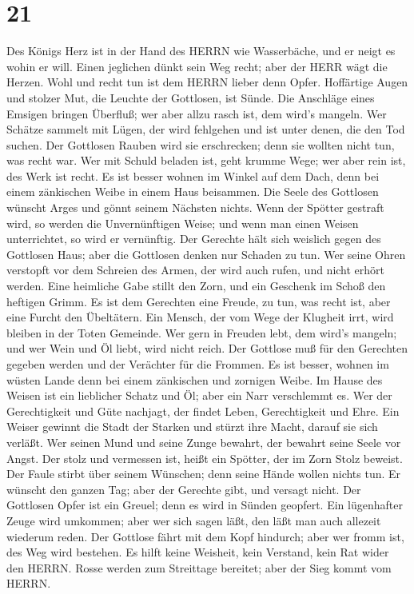 \hypertarget{section-20}{%
\section{21}\label{section-20}}

 Des Königs Herz ist in der Hand des HERRN wie Wasserbäche,
und er neigt es wohin er will.  Einen jeglichen dünkt sein
Weg recht; aber der HERR wägt die Herzen.  Wohl und recht
tun ist dem HERRN lieber denn Opfer.  Hoffärtige Augen und
stolzer Mut, die Leuchte der Gottlosen, ist Sünde.  Die
Anschläge eines Emsigen bringen Überfluß; wer aber allzu rasch ist, dem
wird's mangeln.  Wer Schätze sammelt mit Lügen, der wird
fehlgehen und ist unter denen, die den Tod suchen.  Der
Gottlosen Rauben wird sie erschrecken; denn sie wollten nicht tun, was
recht war.  Wer mit Schuld beladen ist, geht krumme Wege;
wer aber rein ist, des Werk ist recht.  Es ist besser wohnen
im Winkel auf dem Dach, denn bei einem zänkischen Weibe in einem Haus
beisammen.  Die Seele des Gottlosen wünscht Arges und gönnt
seinem Nächsten nichts.  Wenn der Spötter gestraft wird, so
werden die Unvernünftigen Weise; und wenn man einen Weisen unterrichtet,
so wird er vernünftig.  Der Gerechte hält sich weislich
gegen des Gottlosen Haus; aber die Gottlosen denken nur Schaden zu tun.
 Wer seine Ohren verstopft vor dem Schreien des Armen, der
wird auch rufen, und nicht erhört werden.  Eine heimliche
Gabe stillt den Zorn, und ein Geschenk im Schoß den heftigen Grimm.
 Es ist dem Gerechten eine Freude, zu tun, was recht ist,
aber eine Furcht den Übeltätern.  Ein Mensch, der vom Wege
der Klugheit irrt, wird bleiben in der Toten Gemeinde.  Wer
gern in Freuden lebt, dem wird's mangeln; und wer Wein und Öl liebt,
wird nicht reich.  Der Gottlose muß für den Gerechten
gegeben werden und der Verächter für die Frommen.  Es ist
besser, wohnen im wüsten Lande denn bei einem zänkischen und zornigen
Weibe.  Im Hause des Weisen ist ein lieblicher Schatz und
Öl; aber ein Narr verschlemmt es.  Wer der Gerechtigkeit
und Güte nachjagt, der findet Leben, Gerechtigkeit und Ehre.
 Ein Weiser gewinnt die Stadt der Starken und stürzt ihre
Macht, darauf sie sich verläßt.  Wer seinen Mund und seine
Zunge bewahrt, der bewahrt seine Seele vor Angst.  Der
stolz und vermessen ist, heißt ein Spötter, der im Zorn Stolz beweist.
 Der Faule stirbt über seinem Wünschen; denn seine Hände
wollen nichts tun.  Er wünscht den ganzen Tag; aber der
Gerechte gibt, und versagt nicht.  Der Gottlosen Opfer ist
ein Greuel; denn es wird in Sünden geopfert.  Ein
lügenhafter Zeuge wird umkommen; aber wer sich sagen läßt, den läßt man
auch allezeit wiederum reden.  Der Gottlose fährt mit dem
Kopf hindurch; aber wer fromm ist, des Weg wird bestehen. 
Es hilft keine Weisheit, kein Verstand, kein Rat wider den HERRN.
 Rosse werden zum Streittage bereitet; aber der Sieg kommt
vom HERRN.

